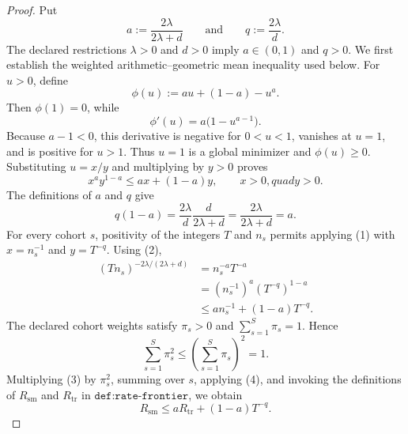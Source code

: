 \documentclass{article}
\begin{document}
\begin{proof}
Put
\[
a:=\frac{2\lambda}{2\lambda+d}
\qquad\text{and}\qquad
q:=\frac{2\lambda}{d}.
\]
The declared restrictions \(\lambda>0\) and \(d>0\) imply \(a\in(0,1)\) and \(q>0\).  We first establish the weighted arithmetic--geometric mean inequality used below.  For \(u>0\), define
\[
\phi(u):=au+(1-a)-u^a.
\]
Then \(\phi(1)=0\), while
\[
\phi'(u)=a\bigl(1-u^{a-1}\bigr).
\]
Because \(a-1<0\), this derivative is negative for \(0<u<1\), vanishes at \(u=1\), and is positive for \(u>1\).  Thus \(u=1\) is a global minimizer and \(\phi(u)\geq0\).  Substituting \(u=x/y\) and multiplying by \(y>0\) proves
\[
x^a y^{1-a}\leq ax+(1-a)y,
\qquad x>0,quad y>0.
\tag{1}
\]
The definitions of \(a\) and \(q\) give
\[
q(1-a)
=\frac{2\lambda}{d}\frac{d}{2\lambda+d}
=\frac{2\lambda}{2\lambda+d}
=a.
\tag{2}
\]
For every cohort \(s\), positivity of the integers \(T\) and \(n_s\) permits applying (1) with \(x=n_s^{-1}\) and \(y=T^{-q}\).  Using (2),
\[
\begin{aligned}
(Tn_s)^{-2\lambda/(2\lambda+d)}
&=n_s^{-a}T^{-a}\\
&=(n_s^{-1})^a(T^{-q})^{1-a}\\
&\leq a n_s^{-1}+(1-a)T^{-q}.
\end{aligned}
\tag{3}
\]
The declared cohort weights satisfy \(\pi_s>0\) and \(\sum_{s=1}^S\pi_s=1\).  Hence
\[
\sum_{s=1}^S\pi_s^2
\leq\left(\sum_{s=1}^S\pi_s\right)^2
=1.
\tag{4}
\]
Multiplying (3) by \(\pi_s^2\), summing over \(s\), applying (4), and invoking the definitions of \(R_{\mathrm{sm}}\) and \(R_{\mathrm{tr}}\) in \(\texttt{def:rate-frontier}\), we obtain
\[
R_{\mathrm{sm}}
\leq aR_{\mathrm{tr}}+(1-a)T^{-q}.
\tag{5}
\]


\end{proof}
\end{document}
